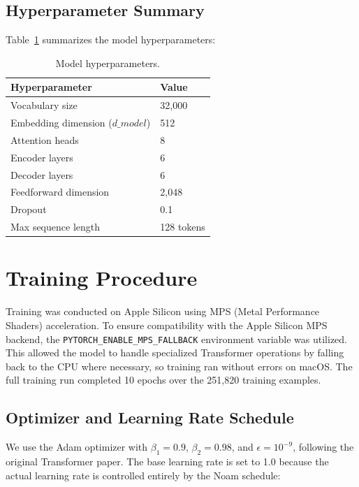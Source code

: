 \documentclass[11pt]{article}
\begin{document}
\subsection{Hyperparameter Summary}

Table~\ref{tab:hyperparams} summarizes the model hyperparameters:

\begin{table}[h]
\centering
\begin{tabular}{@{}ll@{}}
\toprule
\textbf{Hyperparameter} & \textbf{Value} \\
\midrule
Vocabulary size & 32,000 \\
Embedding dimension ($d\_model$) & 512 \\
Attention heads & 8 \\
Encoder layers & 6 \\
Decoder layers & 6 \\
Feedforward dimension & 2,048 \\
Dropout & 0.1 \\
Max sequence length & 128 tokens \\
\bottomrule
\end{tabular}
\caption{Model hyperparameters.}
\label{tab:hyperparams}
\end{table}

\section{Training Procedure}

Training was conducted on Apple Silicon using MPS (Metal Performance Shaders) acceleration. To ensure compatibility with the Apple Silicon MPS backend, the \texttt{PYTORCH\_ENABLE\_MPS\_FALLBACK} environment variable was utilized. This allowed the model to handle specialized Transformer operations by falling back to the CPU where necessary, so training ran without errors on macOS. The full training run completed 10 epochs over the 251,820 training examples.

\subsection{Optimizer and Learning Rate Schedule}

We use the Adam optimizer with $\beta_1 = 0.9$, $\beta_2 = 0.98$, and $\epsilon = 10^{-9}$, following the original Transformer paper. The base learning rate is set to 1.0 because the actual learning rate is controlled entirely by the Noam schedule:
\end{document}
